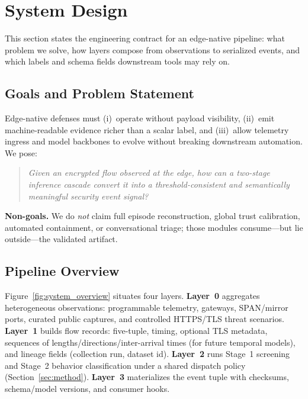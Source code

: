 \section{System Design}
\label{sec:design}

This section states the engineering contract for an edge-native pipeline: what problem we solve, how layers compose from observations to serialized events, and which labels and schema fields downstream tools may rely on.

\subsection{Goals and Problem Statement}

Edge-native defenses must (i)~operate without payload visibility, (ii)~emit machine-readable evidence richer than a scalar label, and (iii)~allow telemetry ingress and model backbones to evolve without breaking downstream automation.
We pose:
\begin{quote}\small
\emph{Given an encrypted flow observed at the edge, how can a two-stage inference cascade convert it into a threshold-consistent and semantically meaningful security event signal?}
\end{quote}

\textbf{Non-goals.}
We do \emph{not} claim full episode reconstruction, global trust calibration, automated containment, or conversational triage; those modules consume---but lie outside---the validated artifact.

\subsection{Pipeline Overview}

Figure~\ref{fig:system_overview} situates four layers.
\textbf{Layer~0} aggregates heterogeneous observations: programmable telemetry, gateways, SPAN/mirror ports, curated public captures, and controlled HTTPS/TLS threat scenarios.
\textbf{Layer~1} builds flow records: five-tuple, timing, optional TLS metadata, sequences of lengths/directions/inter-arrival times (for future temporal models), and lineage fields (collection run, dataset id).
\textbf{Layer~2} runs Stage~1 screening and Stage~2 behavior classification under a shared dispatch policy (Section~\ref{sec:method}).
\textbf{Layer~3} materializes the event tuple with checksums, schema/model versions, and consumer hooks.

